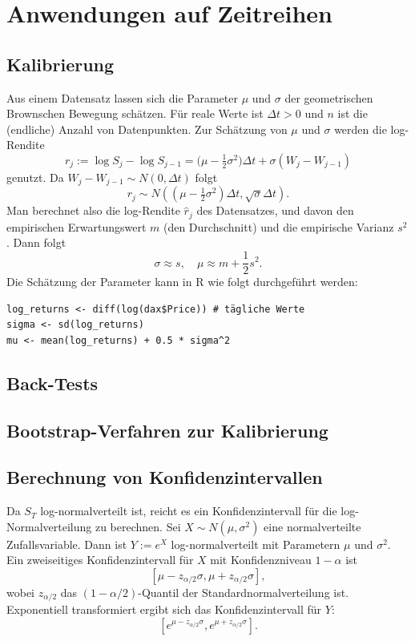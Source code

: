 \section{Anwendungen auf Zeitreihen}

\subsection{Kalibrierung}
Aus einem Datensatz lassen sich die Parameter $\mu$ und $\sigma$ der
geometrischen Brownschen Bewegung schätzen. 
Für reale Werte ist $\Delta t \gt 0$ und $n$ ist die (endliche) Anzahl von Datenpunkten. 
Zur Schätzung von $\mu$ und $\sigma$ werden die log-Rendite
$$r_j := \log S_j - \log S_{j-1}= \big(\mu - \tfrac12 \sigma^2\big)\Delta t + \sigma (W_j - W_{j-1})$$
genutzt. Da $W_j - W_{j-1} \sim N(0, \Delta t)$ folgt
$$r_j \sim N((\mu - \tfrac12 \sigma^2)\Delta t, \sqrt{\sigma} \Delta t).$$
Man berechnet also die log-Rendite $\hat r_j$ des Datensatzes, 
und davon den empirischen Erwartungswert $m$ (den Durchschnitt) und die empirische Varianz $s^2$. 
Dann folgt $$\sigma \approx s,\quad \mu \approx m + \frac{1}{2} s^2.$$
Die Schätzung der Parameter kann in R wie folgt durchgeführt werden:

\begin{lstlisting}
log_returns <- diff(log(dax$Price)) # tägliche Werte
sigma <- sd(log_returns)
mu <- mean(log_returns) + 0.5 * sigma^2
\end{lstlisting}

\subsection{Back-Tests}

\begin{lemma}
\end{lemma}


\subsection{Bootstrap-Verfahren zur Kalibrierung}

\subsection{Berechnung von Konfidenzintervallen}

Da $S_T$ log-normalverteilt ist, reicht es ein Konfidenzintervall für die log-Normalverteilung
zu berechnen.
Sei $X \sim N(\mu, \sigma^2)$ eine normalverteilte Zufallsvariable.
Dann ist $Y := e^X$ log-normalverteilt mit Parametern $\mu$ und $\sigma^2$.
Ein zweiseitiges Konfidenzintervall für $X$ mit Konfidenzniveau $1-\alpha$ ist
$$[\mu - z_{\alpha/2} \sigma, \mu + z_{\alpha/2} \sigma],$$
wobei $z_{\alpha/2}$ das $(1-\alpha/2)$-Quantil der Standardnormalverteilung ist.
Exponentiell transformiert ergibt sich das Konfidenzintervall für $Y$:
$$[e^{\mu - z_{\alpha/2} \sigma}, e^{\mu + z_{\alpha/2} \sigma}].$$

